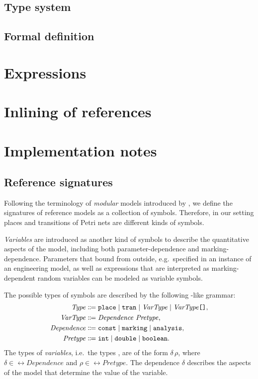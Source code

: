 \subsection{Type system}

\subsection{Formal definition}

\section{Expressions}

\section{Inlining of references}

\section{Implementation notes}

\subsection{Reference  signatures}

Following the terminology of \emph{modular } models introduced by \citet{Kindler01modular}, we define the signatures of reference  models as a collection of symbols. Therefore, in our setting places and transitions of Petri nets are different kinds of symbols.

\emph{Variables} are introduced as another kind of symbols to describe the quantitative aspects of the model, including both parameter-dependence and marking-dependence. Parameters that bound from outside, e.g.\ specified in an instance of an engineering model, as well as expressions that are interpreted as marking-dependent random variables can be modeled as variable symbols.

The possible types of symbols are described by the following -like grammar:
\begin{equation}
  \begin{aligned}
    \ebnfVar{Type} &\ebnfEq \lit{place} \mid \lit{tran} \mid \ebnfVar{VarType} \mid \bagtype{\ebnfVar{VarType}} \text, \\
    \ebnfVar{VarType} &\ebnfEq \ebnfVar{Dependence}\ \ebnfVar{Pretype} \text,\\
    \rel{Dependence} &\ebnfEq \lit{const} \mid \lit{marking} \mid \lit{analysis}\text, \\
    \ebnfVar{Pretype} &\ebnfEq \lit{int} \mid \lit{double} \mid \lit{boolean} \text.
  \end{aligned} \label{eq:rgspn:type-ebnf}
\end{equation}
The types of \emph{variables}, i.e.~the types , are of the form \(\delta\, \rho\), where \(\delta \in \rel{Dependence}\) and \(\rho \in \rel{Pretype}\). The dependence \(\delta\) describes the aspects of the model that determine the value of the variable.

